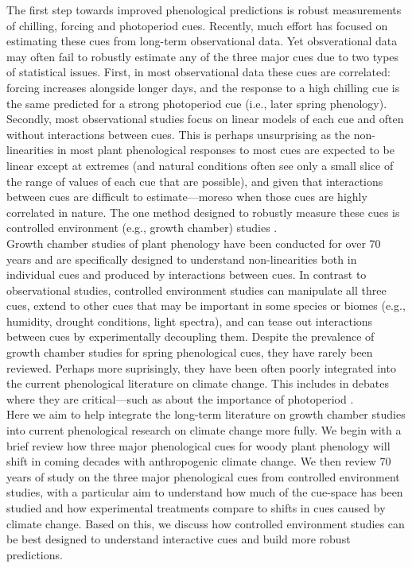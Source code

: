 \documentclass[11pt,letter]{article}
\begin{document}
The first step towards improved phenological predictions is robust measurements of chilling, forcing and photoperiod cues. Recently, much effort has focused on estimating these cues from long-term observational data. Yet obsverational data may often fail to robustly estimate any of the three major cues due to two types of statistical issues. First, in most observational data these cues are correlated: forcing increases alongside longer days, and the response to a high chilling cue is the same predicted for a strong photoperiod cue (i.e., later spring phenology). Secondly, most observational studies focus on linear models of each cue and often without interactions between cues. This is perhaps unsurprising as the non-linearities in most plant phenological responses to most cues are expected to be linear except at extremes (and natural conditions often see only a small slice of the range of values of each cue that are possible), and given that interactions between cues are difficult to estimate---moreso when those cues are highly correlated in nature. The one method designed to robustly measure these cues is controlled environment (e.g., growth chamber) studies \citep{nagano2012,satake2013}.\\

Growth chamber studies of plant phenology have been conducted for over 70 years and are specifically designed to understand non-linearities both in individual cues and produced by interactions between cues. In contrast to observational studies, controlled environment studies can manipulate all three cues, extend to other cues that may be important in some species or biomes (e.g., humidity, drought conditions, light spectra), and can tease out interactions between cues by experimentally decoupling them. Despite the prevalence of growth chamber studies for spring phenological cues, they have rarely been reviewed. Perhaps more suprisingly, they have been often poorly integrated into the current phenological literature on climate change. This includes in debates where they are critical---such as about the importance of photoperiod \citep[e.g.,]{fu2015,richspurce2018}.\\

Here we aim to help integrate the long-term literature on growth chamber studies into current phenological research on climate change more fully. We begin with a brief review how three major phenological cues for woody plant phenology will shift in coming decades with anthropogenic climate change. We then review 70 years of study on the three major phenological cues from controlled environment studies, with a particular aim to understand how much of the cue-space has been studied and how experimental treatments compare to shifts in cues caused by climate change. Based on this, we discuss how controlled environment studies can be best designed to understand interactive cues and build more robust predictions.\\
\end{document}
